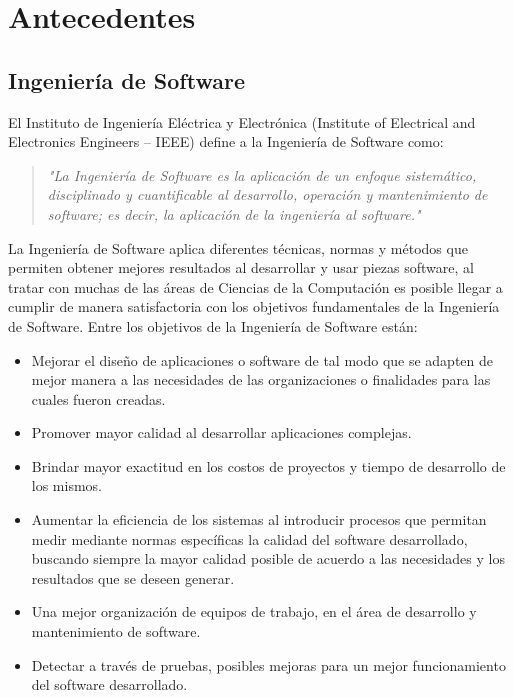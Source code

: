 \chapter{Antecedentes}
    \label{cha:Antecedentes}

     \section{Ingeniería de Software}

 El Instituto de Ingeniería Eléctrica y Electrónica (Institute of Electrical and Electronics Engineers – IEEE) define a la Ingeniería de Software como:

\begin{quote}
\textit{"La Ingeniería de Software\cite{IeeeSG} es la aplicación de un enfoque sistemático, disciplinado y cuantificable al desarrollo, operación y mantenimiento de software; es decir, la aplicación de la ingeniería al software."}
\end{quote}

La Ingeniería de Software aplica diferentes técnicas, normas y métodos que permiten obtener mejores resultados al desarrollar y usar piezas software, al tratar con muchas de las áreas de Ciencias de la Computación es posible llegar a cumplir de manera satisfactoria con los objetivos fundamentales de la Ingeniería de Software. Entre los objetivos de la Ingeniería de Software están\cite{enSWE}:

\begin{itemize}
\item Mejorar el diseño de aplicaciones o software de tal modo que se adapten de mejor manera a las necesidades de las organizaciones o finalidades para las cuales fueron creadas.
\item Promover mayor calidad al desarrollar aplicaciones complejas.
\item Brindar mayor exactitud en los costos de proyectos y tiempo de desarrollo de los mismos.
\item Aumentar la eficiencia de los sistemas al introducir procesos que permitan medir mediante normas específicas la calidad del software desarrollado, buscando siempre la mayor calidad posible de acuerdo a  las necesidades y los resultados que se deseen generar.
\item Una mejor organización de equipos de trabajo, en el área de desarrollo y mantenimiento de software.
\item Detectar a través de pruebas, posibles mejoras para un mejor funcionamiento del software desarrollado.
\end{itemize} 

